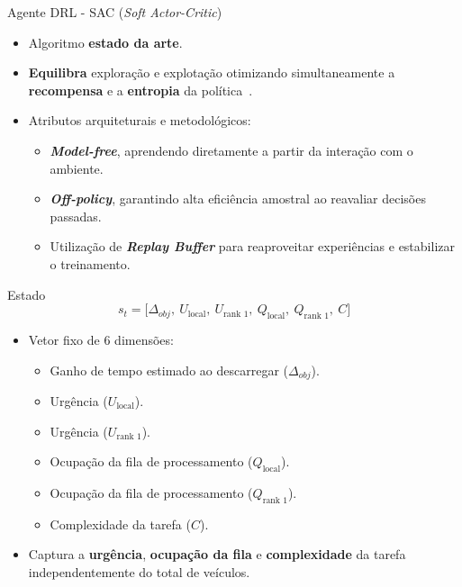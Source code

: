 \documentclass[aspectratio=169]{beamer}
\begin{document}
\begin{frame}{Agente DRL - SAC (\textit{Soft Actor-Critic})}
    \begin{itemize}
        \item Algoritmo \textbf{estado da arte}.
        \item \textbf{Equilibra} exploração e explotação otimizando simultaneamente a \textbf{recompensa} e a \textbf{entropia} da política~\cite{haarnoja2018sac}.
        \item Atributos arquiteturais e metodológicos:
        \begin{itemize}
            \item \textbf{\textit{Model-free}}, aprendendo diretamente a partir da interação com o ambiente.
            \item \textbf{\textit{Off-policy}}, garantindo alta eficiência amostral ao reavaliar decisões passadas.
            \item Utilização de \textbf{\textit{Replay Buffer}} para reaproveitar experiências e estabilizar o treinamento.
        \end{itemize}
    \end{itemize}
\end{frame}

\begin{frame}{Estado}
    \vspace{-0.2cm}
    \begin{equation*}
        s_t = \big[ \Delta_{obj}, \ U_{\text{local}}, \ U_{\text{rank 1}}, \ Q_{\text{local}}, \ Q_{\text{rank 1}}, \ C \big]
    \end{equation*}
    \begin{itemize}
        \item Vetor fixo de 6 dimensões:
        \begin{itemize}
            \item Ganho de tempo estimado ao descarregar ($\Delta_{obj}$).
            \item Urgência ($U_{\text{local}}$).
            \item Urgência ($U_{\text{rank 1}}$).
            \item Ocupação da fila de processamento ($Q_{\text{local}}$).
            \item Ocupação da fila de processamento ($Q_{\text{rank 1}}$).
            \item Complexidade da tarefa ($C$).
       \end{itemize}
        \item Captura a \textbf{urgência}, \textbf{ocupação da fila} e \textbf{complexidade} da tarefa independentemente do total de veículos.
    \end{itemize}
\end{frame}
\end{document}
